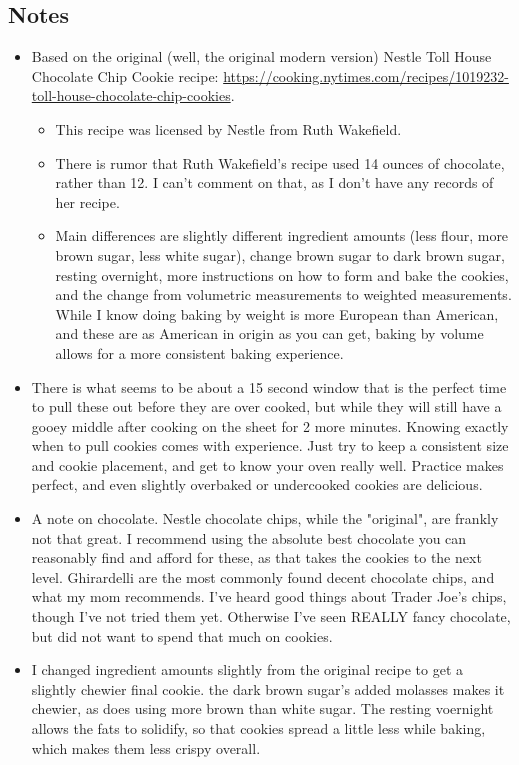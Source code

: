 \begin{multicols}{2}
\subsection*{Notes}
\begin{itemize}
    \item Based on the original (well, the original modern version) Nestle Toll House Chocolate Chip Cookie recipe: \url{https://cooking.nytimes.com/recipes/1019232-toll-house-chocolate-chip-cookies}.
    \begin{itemize}
        \item This recipe was licensed by Nestle from Ruth Wakefield.
        \item There is rumor that Ruth Wakefield's recipe used 14 ounces of chocolate, rather than 12. I can't comment on that, as I don't have any records of her recipe.
        \item Main differences are slightly different ingredient amounts (less flour, more brown sugar, less white sugar), change brown sugar to dark brown sugar, resting overnight, more instructions on how to form and bake the cookies, and the change from volumetric measurements to weighted measurements. While I know doing baking by weight is more European than American, and these are as American in origin as you can get, baking by volume allows for a more consistent baking experience.
    \end{itemize}
    \item There is what seems to be about a 15 second window that is the perfect time to pull these out before they are over cooked, but while they will still have a gooey middle after cooking on the sheet for 2 more minutes. Knowing exactly when to pull cookies comes with experience. Just try to keep a consistent size and cookie placement, and get to know your oven really well. Practice makes perfect, and even slightly overbaked or undercooked cookies are delicious.
    \item A note on chocolate. Nestle chocolate chips, while the "original", are frankly not that great. I recommend using the absolute best chocolate you can reasonably find and afford for these, as that takes the cookies to the next level. Ghirardelli are the most commonly found decent chocolate chips, and what my mom recommends. I've heard good things about Trader Joe's chips, though I've not tried them yet. Otherwise I've seen REALLY fancy chocolate, but did not want to spend that much on cookies.
    \item I changed ingredient amounts slightly from the original recipe to get a slightly chewier final cookie. the dark brown sugar's added molasses makes it chewier, as does using more brown than white sugar. The resting voernight allows the fats to solidify, so that cookies spread a little less while baking, which makes them less crispy overall.

\end{itemize}
\end{multicols}
